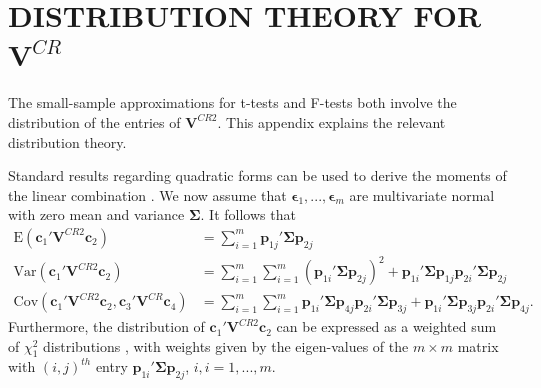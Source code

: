 \documentclass[12pt]{article}\usepackage[]{graphicx}\usepackage[]{color}
\newcommand{\E}{\text{E}}
\newcommand{\Cov}{\text{Cov}}
\newcommand{\Var}{\text{Var}}
\newcommand{\bm}{\mathbf}
\newcommand{\bs}{\boldsymbol}
\begin{document}
\section{DISTRIBUTION THEORY FOR $\bm{V}^{CR}$}
\label{app:VCR_dist}

The small-sample approximations for t-tests and F-tests both involve the distribution of the entries of $\bm{V}^{CR2}$. This appendix explains the relevant distribution theory.


Standard results regarding quadratic forms can be used to derive the moments of the linear combination \citep[e.g.,][Sec. 13.5]{Searle2006matrix}. We now assume that $\bs\epsilon_1,...,\bs\epsilon_m$ are multivariate normal with zero mean and variance $\bs\Sigma$. It follows that 
\begin{align}
\label{eq:CRVE_expectation}
\E\left(\bm{c}_1' \bm{V}^{CR2} \bm{c}_2\right) &= \sum_{i=1}^m \bm{p}_{1j}' \bs\Sigma \bm{p}_{2j} \\
\label{eq:CRVE_variance}
\Var\left(\bm{c}_1' \bm{V}^{CR2} \bm{c}_2\right) &= \sum_{i=1}^m \sum_{i=1}^m \left(\bm{p}_{1i}' \bs\Sigma \bm{p}_{2j}\right)^2 + \bm{p}_{1i}' \bs\Sigma \bm{p}_{1j} \bm{p}_{2i}' \bs\Sigma \bm{p}_{2j} \\
\label{eq:CRVE_covariance}
\Cov\left(\bm{c}_1' \bm{V}^{CR2} \bm{c}_2, \bm{c}_3' \bm{V}^{CR} \bm{c}_4\right) &= \sum_{i=1}^m \sum_{i=1}^m \bm{p}_{1i}' \bs\Sigma \bm{p}_{4j} \bm{p}_{2i}' \bs\Sigma \bm{p}_{3j} + \bm{p}_{1i}' \bs\Sigma \bm{p}_{3j} \bm{p}_{2i}' \bs\Sigma \bm{p}_{4j}.
\end{align}
Furthermore, the distribution of $\bm{c}_1' \bm{V}^{CR2} \bm{c}_2$ can be expressed as a weighted sum of $\chi^2_1$ distributions \citep{mathai1992quadratic}, with weights given by the eigen-values of the $m \times m$ matrix with $\left(i,j\right)^{th}$ entry $\bm{p}_{1i}' \bs\Sigma \bm{p}_{2j}$, $i,i=1,...,m$.



\end{document}
